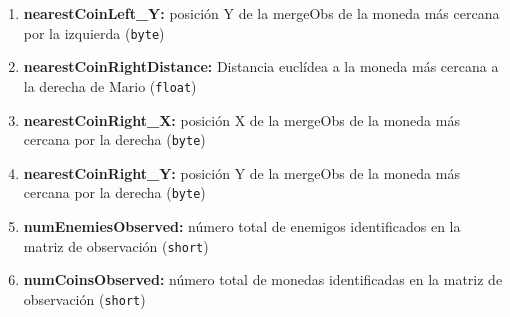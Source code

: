 \documentclass[10pt, spanish, pdftex]{../.template/template}
\begin{document}
\begin{enumerate}
        \item \textbf{nearestCoinLeft\_Y:} posición Y de la mergeObs de la moneda más cercana por la izquierda (\texttt{byte})
        \item \textbf{nearestCoinRightDistance:} Distancia euclídea a la moneda más cercana a la derecha de Mario (\texttt{float})
        \item \textbf{nearestCoinRight\_X:} posición X de la mergeObs de la moneda más cercana por la derecha (\texttt{byte})
        \item \textbf{nearestCoinRight\_Y:} posición Y de la mergeObs de la moneda más cercana por la derecha (\texttt{byte})
        \item \textbf{numEnemiesObserved:} número total de enemigos identificados en la matriz de observación (\texttt{short})
        \item \textbf{numCoinsObserved:} número total de monedas identificadas en la matriz de observación (\texttt{short})
    \end{enumerate}
\end{document}
